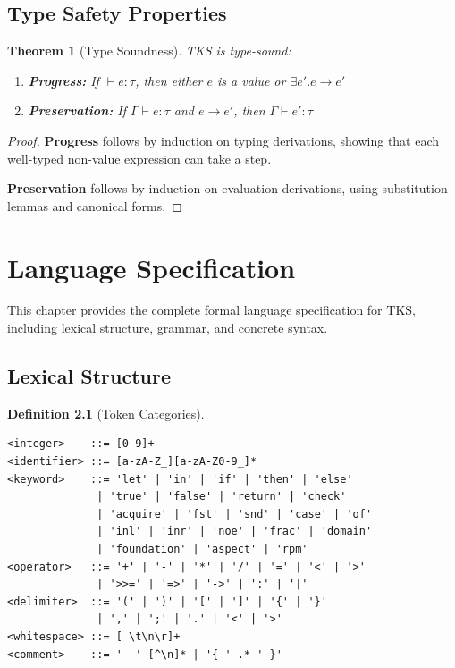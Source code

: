 \documentclass[11pt,twoside,openright]{book}
\theoremstyle{definition}
\newtheorem{definition}{Definition}[chapter]
\theoremstyle{plain}
\newtheorem{theorem}[definition]{Theorem}
\theoremstyle{remark}
\newcommand{\smallstep}{\to}
\begin{document}
\section{Type Safety Properties}

\begin{theorem}[Type Soundness]
\label{thm:type-soundness}
TKS is type-sound:
\begin{enumerate}
\item \textbf{Progress:} If $\vdash e : \tau$, then either $e$ is a value or $\exists e'. e \smallstep e'$
\item \textbf{Preservation:} If $\Gamma \vdash e : \tau$ and $e \smallstep e'$, then $\Gamma \vdash e' : \tau$
\end{enumerate}
\end{theorem}

\begin{proof}
\textbf{Progress} follows by induction on typing derivations, showing that each well-typed non-value expression can take a step.

\textbf{Preservation} follows by induction on evaluation derivations, using substitution lemmas and canonical forms.
\end{proof}

\chapter{Language Specification}
\label{ch:language-spec}

This chapter provides the complete formal language specification for TKS, including lexical structure, grammar, and concrete syntax.

\section{Lexical Structure}

\begin{definition}[Token Categories]
\label{def:tokens}
\begin{verbatim}
<integer>    ::= [0-9]+
<identifier> ::= [a-zA-Z_][a-zA-Z0-9_]*
<keyword>    ::= 'let' | 'in' | 'if' | 'then' | 'else'
              | 'true' | 'false' | 'return' | 'check'
              | 'acquire' | 'fst' | 'snd' | 'case' | 'of'
              | 'inl' | 'inr' | 'noe' | 'frac' | 'domain'
              | 'foundation' | 'aspect' | 'rpm'
<operator>   ::= '+' | '-' | '*' | '/' | '=' | '<' | '>'
              | '>>=' | '=>' | '->' | ':' | '|'
<delimiter>  ::= '(' | ')' | '[' | ']' | '{' | '}'
              | ',' | ';' | '.' | '<' | '>'
<whitespace> ::= [ \t\n\r]+
<comment>    ::= '--' [^\n]* | '{-' .* '-}'
\end{verbatim}
\end{definition}
\end{document}
